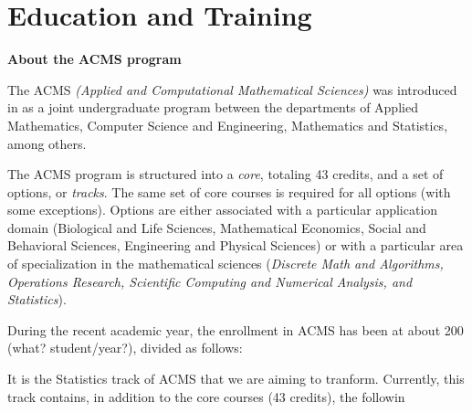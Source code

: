 \section{Education and Training}
\label{sec:education}


{\bf About the ACMS program}

The ACMS {\em (Applied and Computational Mathematical Sciences)} was
introduced in  as a joint undergraduate program between the
departments of Applied Mathematics, Computer Science and Engineering,
Mathematics and Statistics, among others.

The ACMS program is structured into a {\em core}, totaling 43 credits,
and a set of options, or {\em tracks}. The same set of core courses is
required for all options (with some exceptions). Options are either
associated with a particular application domain (Biological and Life
Sciences, Mathematical Economics, Social and Behavioral Sciences,
Engineering and Physical Sciences) or with a particular area of
specialization in the mathematical sciences ({\em Discrete Math and
  Algorithms, Operations Research, Scientific Computing and Numerical
  Analysis, and Statistics}). 

During the recent academic year, the enrollment in ACMS has been at
about 200 (what? student/year?), divided as follows: 


It is the Statistics track of ACMS that we are aiming to tranform. Currently, this track contains, in addition to the core courses (43 credits), the followin

